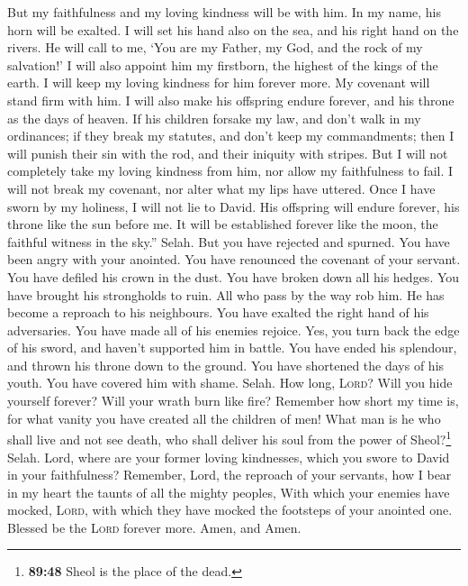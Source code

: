  But my faithfulness and my loving kindness will be with
him. In my name, his horn will be exalted.  I will set
his hand also on the sea, and his right hand on the rivers.
 He will call to me, `You are my Father, my God, and the
rock of my salvation!'  I will also appoint him my
firstborn, the highest of the kings of the earth.  I will
keep my loving kindness for him forever more. My covenant will stand
firm with him.  I will also make his offspring endure
forever, and his throne as the days of heaven.  If his
children forsake my law, and don't walk in my ordinances;
 if they break my statutes, and don't keep my
commandments;  then I will punish their sin with the rod,
and their iniquity with stripes.  But I will not
completely take my loving kindness from him, nor allow my faithfulness
to fail.  I will not break my covenant, nor alter what my
lips have uttered.  Once I have sworn by my holiness, I
will not lie to David.  His offspring will endure
forever, his throne like the sun before me.  It will be
established forever like the moon, the faithful witness in the sky.''
Selah.  But you have rejected and spurned. You have been
angry with your anointed.  You have renounced the
covenant of your servant. You have defiled his crown in the dust.
 You have broken down all his hedges. You have brought
his strongholds to ruin.  All who pass by the way rob
him. He has become a reproach to his neighbours.  You
have exalted the right hand of his adversaries. You have made all of his
enemies rejoice.  Yes, you turn back the edge of his
sword, and haven't supported him in battle.  You have
ended his splendour, and thrown his throne down to the ground.
 You have shortened the days of his youth. You have
covered him with shame. Selah.  How long, \textsc{Lord}?
Will you hide yourself forever? Will your wrath burn like fire?
 Remember how short my time is, for what vanity you have
created all the children of men!  What man is he who
shall live and not see death, who shall deliver his soul from the power
of Sheol?\footnote{\textbf{89:48} Sheol is the place of the dead.}
Selah.  Lord, where are your former loving kindnesses,
which you swore to David in your faithfulness?  Remember,
Lord, the reproach of your servants, how I bear in my heart the taunts
of all the mighty peoples,  With which your enemies have
mocked, \textsc{Lord}, with which they have mocked the footsteps of your
anointed one.  Blessed be the \textsc{Lord} forever more.
Amen, and Amen.

